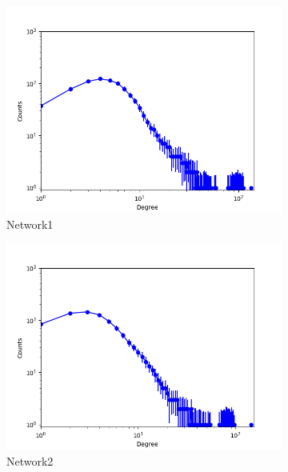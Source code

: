 
\begin{figure}[h]
        \centering
        \begin{subfigure}[b]{0.300\textwidth}
            \centering
            \includegraphics[width=\textwidth]{img/corpus/immsb_network1_0}
            \caption {{\small Network1}}    
        \end{subfigure}
        \begin{subfigure}[b]{0.300\textwidth}
            \centering
            \includegraphics[width=\textwidth]{img/corpus/immsb_network2_0}
            \caption {{\small Network2}}    
        \end{subfigure}
        \begin{subfigure}[b]{0.300\textwidth}

\end{subfigure}
\end{figure}

